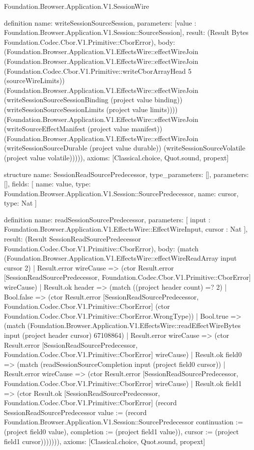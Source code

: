 \begin{lexlean}{Foundation.Browser.Application.V1.SessionWire}
\begin{semanticmodule}
definition{
  name: writeSessionSourceSession,
  parameters: [value : Foundation.Browser.Application.V1.Session::SourceSession],
  result: (Result Bytes Foundation.Codec.Cbor.V1.Primitive::CborError),
  body: (Foundation.Browser.Application.V1.EffectsWire::effectWireJoin (Foundation.Browser.Application.V1.EffectsWire::effectWireJoin (Foundation.Codec.Cbor.V1.Primitive::writeCborArrayHead 5 (sourceWireLimits)) (Foundation.Browser.Application.V1.EffectsWire::effectWireJoin (writeSessionSourceSessionBinding (project value binding)) (writeSessionSourceSessionLimits (project value limits)))) (Foundation.Browser.Application.V1.EffectsWire::effectWireJoin (writeSourceEffectManifest (project value manifest)) (Foundation.Browser.Application.V1.EffectsWire::effectWireJoin (writeSessionSourceDurable (project value durable)) (writeSessionSourceVolatile (project value volatile))))),
  axioms: [Classical.choice, Quot.sound, propext]
}

structure{
  name: SessionReadSourcePredecessor,
  type_parameters: [],
  parameters: [],
  fields: [
    {name: value, type: Foundation.Browser.Application.V1.Session::SourcePredecessor},
    {name: cursor, type: Nat}
  ]
}

definition{
  name: readSessionSourcePredecessor,
  parameters: [
    input : Foundation.Browser.Application.V1.EffectsWire::EffectWireInput,
    cursor : Nat
  ],
  result: (Result SessionReadSourcePredecessor Foundation.Codec.Cbor.V1.Primitive::CborError),
  body: (match (Foundation.Browser.Application.V1.EffectsWire::effectWireReadArray input cursor 2)
    | Result.error wireCause => (ctor Result.error [SessionReadSourcePredecessor, Foundation.Codec.Cbor.V1.Primitive::CborError] wireCause)
    | Result.ok header => (match ((project header count) =? 2)
      | Bool.false => (ctor Result.error [SessionReadSourcePredecessor, Foundation.Codec.Cbor.V1.Primitive::CborError] (ctor Foundation.Codec.Cbor.V1.Primitive::CborError.WrongType))
      | Bool.true => (match (Foundation.Browser.Application.V1.EffectsWire::readEffectWireBytes input (project header cursor) 67108864)
        | Result.error wireCause => (ctor Result.error [SessionReadSourcePredecessor, Foundation.Codec.Cbor.V1.Primitive::CborError] wireCause)
        | Result.ok field0 => (match (readSessionSourceCompletion input (project field0 cursor))
          | Result.error wireCause => (ctor Result.error [SessionReadSourcePredecessor, Foundation.Codec.Cbor.V1.Primitive::CborError] wireCause)
          | Result.ok field1 => (ctor Result.ok [SessionReadSourcePredecessor, Foundation.Codec.Cbor.V1.Primitive::CborError] (record SessionReadSourcePredecessor {value := (record Foundation.Browser.Application.V1.Session::SourcePredecessor {continuation := (project field0 value), completion := (project field1 value)}), cursor := (project field1 cursor)})))))),
  axioms: [Classical.choice, Quot.sound, propext]
}


\end{semanticmodule}
\end{lexlean}
